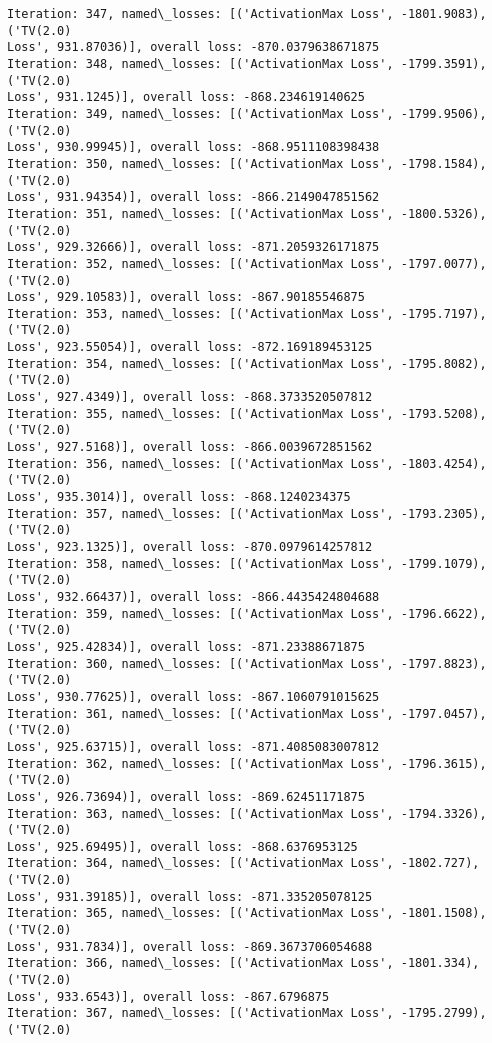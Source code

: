 \documentclass[10pt]{article}
\begin{document}
\begin{Verbatim}[commandchars=\\\{\}]
Iteration: 347, named\_losses: [('ActivationMax Loss', -1801.9083), ('TV(2.0)
Loss', 931.87036)], overall loss: -870.0379638671875
Iteration: 348, named\_losses: [('ActivationMax Loss', -1799.3591), ('TV(2.0)
Loss', 931.1245)], overall loss: -868.234619140625
Iteration: 349, named\_losses: [('ActivationMax Loss', -1799.9506), ('TV(2.0)
Loss', 930.99945)], overall loss: -868.9511108398438
Iteration: 350, named\_losses: [('ActivationMax Loss', -1798.1584), ('TV(2.0)
Loss', 931.94354)], overall loss: -866.2149047851562
Iteration: 351, named\_losses: [('ActivationMax Loss', -1800.5326), ('TV(2.0)
Loss', 929.32666)], overall loss: -871.2059326171875
Iteration: 352, named\_losses: [('ActivationMax Loss', -1797.0077), ('TV(2.0)
Loss', 929.10583)], overall loss: -867.90185546875
Iteration: 353, named\_losses: [('ActivationMax Loss', -1795.7197), ('TV(2.0)
Loss', 923.55054)], overall loss: -872.169189453125
Iteration: 354, named\_losses: [('ActivationMax Loss', -1795.8082), ('TV(2.0)
Loss', 927.4349)], overall loss: -868.3733520507812
Iteration: 355, named\_losses: [('ActivationMax Loss', -1793.5208), ('TV(2.0)
Loss', 927.5168)], overall loss: -866.0039672851562
Iteration: 356, named\_losses: [('ActivationMax Loss', -1803.4254), ('TV(2.0)
Loss', 935.3014)], overall loss: -868.1240234375
Iteration: 357, named\_losses: [('ActivationMax Loss', -1793.2305), ('TV(2.0)
Loss', 923.1325)], overall loss: -870.0979614257812
Iteration: 358, named\_losses: [('ActivationMax Loss', -1799.1079), ('TV(2.0)
Loss', 932.66437)], overall loss: -866.4435424804688
Iteration: 359, named\_losses: [('ActivationMax Loss', -1796.6622), ('TV(2.0)
Loss', 925.42834)], overall loss: -871.23388671875
Iteration: 360, named\_losses: [('ActivationMax Loss', -1797.8823), ('TV(2.0)
Loss', 930.77625)], overall loss: -867.1060791015625
Iteration: 361, named\_losses: [('ActivationMax Loss', -1797.0457), ('TV(2.0)
Loss', 925.63715)], overall loss: -871.4085083007812
Iteration: 362, named\_losses: [('ActivationMax Loss', -1796.3615), ('TV(2.0)
Loss', 926.73694)], overall loss: -869.62451171875
Iteration: 363, named\_losses: [('ActivationMax Loss', -1794.3326), ('TV(2.0)
Loss', 925.69495)], overall loss: -868.6376953125
Iteration: 364, named\_losses: [('ActivationMax Loss', -1802.727), ('TV(2.0)
Loss', 931.39185)], overall loss: -871.335205078125
Iteration: 365, named\_losses: [('ActivationMax Loss', -1801.1508), ('TV(2.0)
Loss', 931.7834)], overall loss: -869.3673706054688
Iteration: 366, named\_losses: [('ActivationMax Loss', -1801.334), ('TV(2.0)
Loss', 933.6543)], overall loss: -867.6796875
Iteration: 367, named\_losses: [('ActivationMax Loss', -1795.2799), ('TV(2.0)

\end{Verbatim}
\end{document}
